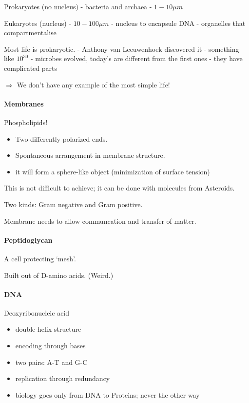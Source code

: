 Prokaryotes (no nucleus) - bacteria and archaea - \(1-10\mu m\)

Eukaryotes (nucleus) - \(10-100\mu m\) - nucleus to encapsule DNA -
organelles that compartmentalise

Most life is prokaryotic. - Anthony van Leeuwenhoek discovered it -
something like \(10^30\) - microbes evolved, today's are different from
the first ones - they have complicated parts

\(\Rightarrow\) We don't have any example of the most simple life!

\hypertarget{membranes}{%
\paragraph{Membranes}\label{membranes}}

Phospholipids!

\begin{itemize}
\tightlist
\item
  Two differently polarized ends.
\item
  Spontaneous arrangement in membrane structure.
\item
  it will form a sphere-like object (minimization of surface tension)
\end{itemize}

This is not difficult to achieve; it can be done with molecules from
Asteroids.

Two kinds: Gram negative and Gram positive.

Membrane needs to allow communcation and transfer of matter.

\hypertarget{peptidoglycan}{%
\paragraph{Peptidoglycan}\label{peptidoglycan}}

A cell protecting `mesh'.

Built out of D-amino acids. (Weird.)

\hypertarget{dna}{%
\paragraph{DNA}\label{dna}}

Deoxyribonucleic acid

\begin{itemize}
\tightlist
\item
  double-helix structure
\item
  encoding through bases
\item
  two pairs: A-T and G-C
\item
  replication through redundancy
\item
  biology goes only from DNA to Proteins; never the other way
\end{itemize}

